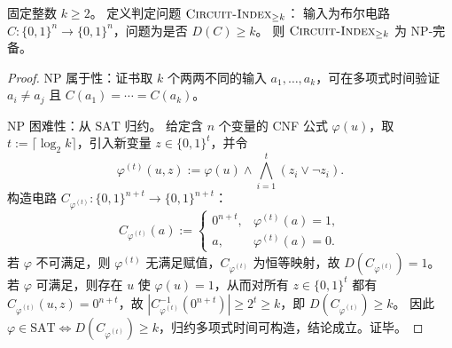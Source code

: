 \begin{theorem}\label{thm:circuit-index-ge-k-np-complete}
固定整数 \(k\ge 2\)。
定义判定问题 \(\text{\normalfont\textsc{Circuit-Index}}_{\ge k}\)：
输入为布尔电路 \(C:\{0,1\}^n\to\{0,1\}^n\)，问题为是否 \(D(C)\ge k\)。
则 \(\text{\normalfont\textsc{Circuit-Index}}_{\ge k}\) 为 \(\mathrm{NP}\)-完备。
\end{theorem}
\begin{proof}
\(\mathrm{NP}\) 属于性：证书取 \(k\) 个两两不同的输入 \(a_1,\dots,a_k\)，可在多项式时间验证 \(a_i\neq a_j\) 且 \(C(a_1)=\cdots=C(a_k)\)。
\par
\(\mathrm{NP}\) 困难性：从 \(\mathrm{SAT}\) 归约。
给定含 \(n\) 个变量的 CNF 公式 \(\varphi(u)\)，取 \(t:=\lceil\log_2 k\rceil\)，引入新变量 \(z\in\{0,1\}^t\)，并令
\[
\varphi^{(t)}(u,z):=\varphi(u)\wedge \bigwedge_{i=1}^{t}(z_i\vee\neg z_i).
\]
构造电路 \(C_{\varphi^{(t)}}:\{0,1\}^{n+t}\to\{0,1\}^{n+t}\)：
\[
C_{\varphi^{(t)}}(a):=
\begin{cases}
0^{n+t}, & \varphi^{(t)}(a)=1,\\
a, & \varphi^{(t)}(a)=0.
\end{cases}
\]
若 \(\varphi\) 不可满足，则 \(\varphi^{(t)}\) 无满足赋值，\(C_{\varphi^{(t)}}\) 为恒等映射，故 \(D(C_{\varphi^{(t)}})=1\)。
若 \(\varphi\) 可满足，则存在 \(u\) 使 \(\varphi(u)=1\)，从而对所有 \(z\in\{0,1\}^t\) 都有 \(C_{\varphi^{(t)}}(u,z)=0^{n+t}\)，故
\(
|C_{\varphi^{(t)}}^{-1}(0^{n+t})|\ge 2^t\ge k
\)，即 \(D(C_{\varphi^{(t)}})\ge k\)。
因此 \(\varphi\in\mathrm{SAT}\iff D(C_{\varphi^{(t)}})\ge k\)，归约多项式时间可构造，结论成立。证毕。
\end{proof}


